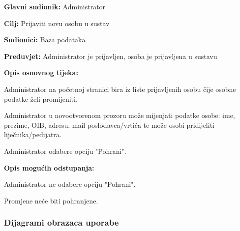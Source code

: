 					\noindent {}
					\begin{packed_item}
						
						\item \textbf{Glavni sudionik: }Administrator
						\item  \textbf{Cilj:} Prijaviti novu osobu u sustav
						\item  \textbf{Sudionici:} Baza podataka
						\item  \textbf{Preduvjet:} Administrator je prijavljen, osoba je prijavljena u sustavu
						\item  \textbf{Opis osnovnog tijeka:}
						
						\item[] \begin{packed_enum}
							
							\item Administrator na početnoj stranici bira iz liste prijavljenih osobu čije osobne podatke želi promijeniti.
							\item Administrator u novootvorenom prozoru može mijenjati podatke osobe: ime, prezime, OIB, adresu, mail poslodavca/vrtića te može osobi pridijeliti liječnika/pedijatra.
							\item Administrator odabere opciju "Pohrani".
						\end{packed_enum}
						
						\item  \textbf{Opis mogućih odstupanja:}
						
						\item[] \begin{packed_item}
							
							\item[3.a] Administrator ne odabere opciju "Pohrani".
							\item[] \begin{packed_enum}
								
								\item Promjene neće biti pohranjene.
							\end{packed_enum}
							
							
						\end{packed_item}
						
						
					\end{packed_item}
					
					
				
					
				\subsubsection{Dijagrami obrazaca uporabe}
					
